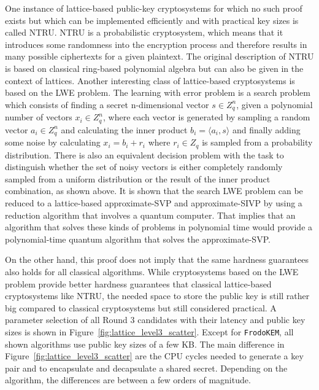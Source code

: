 One instance of lattice-based public-key cryptosystems for which no such proof exists but which can be implemented efficiently and with practical key sizes is called NTRU. NTRU is a probabilistic cryptosystem, which means that it introduces some randomness into the encryption process and therefore results in many possible ciphertexts for a given plaintext\cite{hoffstein1998ntru}. The original description of NTRU is based on classical ring-based polynomial algebra but can also be given in the context of lattices. Another interesting class of lattice-based cryptosystems is based on the \ac{LWE} problem. The learning with error problem is a search problem which consists of finding a secret n-dimensional vector \(s \in Z_q^n\), given a polynomial number of vectors \(x_i \in Z_q^n\), where each vector is generated by sampling a random vector \(a_i \in Z_q^n \) and calculating the inner product \(b_i = \langle a_i, s \rangle \) and finally adding some noise by calculating \(x_i = b_i + r_i\) where \(r_i \in Z_q\) is sampled from a probability distribution. There is also an equivalent decision problem with the task to distinguish whether the set of noisy vectors is either completely randomly sampled from a uniform distribution or the result of the inner product combination, as shown above. It is shown that the search LWE problem can be reduced to a lattice-based approximate-\ac{SVP} and approximate-\ac{SIVP} by using a reduction algorithm that involves a quantum computer. That implies that an algorithm that solves these kinds of problems in polynomial time would provide a polynomial-time quantum algorithm that solves the approximate-\ac{SVP}.

On the other hand, this proof does not imply that the same hardness guarantees also holds for all classical algorithms. While cryptosystems based on the LWE problem provide better hardness guarantees that classical lattice-based cryptosystems like NTRU, the needed space to store the public key is still rather big compared to classical cryptosystems but still considered practical\cite{micciancio2009lattice}. A parameter selection of all Round 3 candidates with their latency and public key sizes is shown in Figure~\ref{fig:lattice_level3_scatter}. Except for \texttt{FrodoKEM}, all shown algorithms use public key sizes of a few KB. The main difference in Figure~\ref{fig:lattice_level3_scatter} are the \acs{CPU} cycles needed to generate a key pair and to encapsulate and decapsulate a shared secret. Depending on the algorithm, the differences are between a few orders of magnitude.

